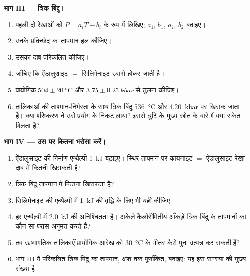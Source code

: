 \begin{problem}[{सप्ताहांत समस्या --- तालिकाओं से ऐलुमिनोसिलिकेट आरेख, और उस पर कितना
भरोसा किया जाए}]
\noindent\textbf{भाग III --- त्रिक बिंदु।}
\begin{enumerate}[resume]
\item पहली दो रेखाओं को $P = a_i T - b_i$ के रूप में लिखिए; $a_1$, $b_1$, $a_2$, $b_2$ बताइए।
\item उनके प्रतिच्छेद का तापमान हल कीजिए।
\item उसका दाब परिकलित कीजिए।
\item जाँचिए कि ऐंडालुसाइट $=$ सिलिमेनाइट उससे होकर जाती है।
\item प्रायोगिक $504 \pm \qty{20}{\celsius}$ और $3.75 \pm
\qty{0.25}{kbar}$ से तुलना कीजिए।
\item तालिकाओं की तापमान-निर्भरता के साथ त्रिक बिंदु
\qty{536}{\celsius} और \qty{4.20}{kbar} पर खिसक जाता है। क्या परिष्करण ने उसे
प्रयोग के निकट लाया? इससे त्रुटि के मुख्य स्रोत के बारे में क्या संकेत मिलता है?
\end{enumerate}

\noindent\textbf{भाग IV --- उस पर कितना भरोसा करें।}
\begin{enumerate}[resume]
\item ऐंडालुसाइट की निर्माण-एन्थैल्पी \qty{1}{kJ} बढ़ाइए। स्थिर तापमान पर
कायनाइट $=$ ऐंडालुसाइट रेखा दाब में कितनी खिसकती है?
\item त्रिक बिंदु तापमान में कितना खिसकता है?
\item सिलिमेनाइट की एन्थैल्पी में \qty{1}{kJ} की वृद्धि के लिए भी यही कीजिए।
\item हर एन्थैल्पी में \qty{2.0}{kJ} की अनिश्चितता है। अकेले कैलोरीमितीय आँकड़े त्रिक बिंदु के
तापमानों का कौन-सा परास अनुमत करते हैं?
\item तब ऊष्मागतिक तालिकाएँ प्रायोगिक आरेख को
\qty{30}{\celsius} के भीतर कैसे पुनः उत्पन्न कर सकती हैं?
\item भाग III में परिकलित त्रिक बिंदु का तापमान, अंश तक पूर्णांकित, बताइए:
यह इस समस्या की मुख्य संख्या है।
\end{enumerate}
\end{problem}
